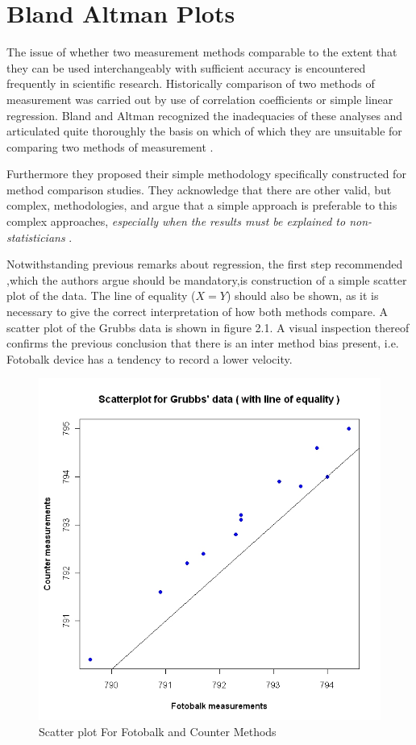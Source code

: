 \documentclass[12pt, a4paper]{report}
\theoremstyle{plain}
\theoremstyle{definition}
\theoremstyle{remark}
\begin{document}
	\section{Bland Altman Plots}
	The issue of whether two measurement methods comparable to the
	extent that they can be used interchangeably with sufficient
	accuracy is encountered frequently in scientific research.
	Historically comparison of two methods of measurement was carried
	out by use of correlation coefficients or simple linear
	regression. Bland and Altman recognized the inadequacies of these
	analyses and articulated quite thoroughly the basis on which of
	which they are unsuitable for comparing two methods of measurement
	\citep*{BA83}.
	
	
	Furthermore they proposed their simple methodology specifically
	constructed for method comparison studies. They acknowledge that
	there are other valid, but complex, methodologies, and argue that
	a simple approach is preferable to this complex approaches,
	\emph{especially when the results must be explained to
		non-statisticians} \citep*{BA83}.
	
	\smallskip
	
	Notwithstanding previous remarks about regression, the first step
	recommended ,which the authors argue should be mandatory,is
	construction of a simple scatter plot of the data. The line of
	equality ($X=Y$) should also be shown, as it is necessary to give
	the correct interpretation of how both methods compare. A scatter
	plot of the Grubbs data is shown in figure 2.1. A visual
	inspection thereof confirms the previous conclusion that there is
	an inter method bias present, i.e. Fotobalk device has a tendency
	to record a lower velocity.
	
	\begin{figure}[h!]
		\begin{center}
			\includegraphics[width=130mm]{images/GrubbsScatter.jpeg}
			\caption{Scatter plot For Fotobalk and Counter Methods}\label{GrubbsScatter}
		\end{center}
	\end{figure}
	
\end{document}
